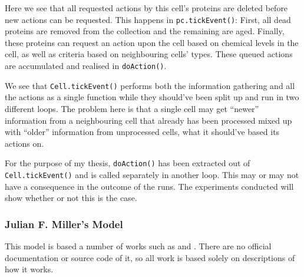 Here we see that all requested actions by this cell's proteins are deleted before new actions can be requested. This happens in \texttt{pc.tickEvent()}: First, all dead proteins are removed from the collection and the remaining are aged. Finally, these proteins can request an action upon the cell based on chemical levels in the cell, as well as criteria based on neighbouring cells' types. These queued actions are accumulated and realised in \texttt{doAction()}.

We see that \texttt{Cell.tickEvent()} performs both the information gathering and all the actions as a single function while they should've been split up and run in two different loops. The problem here is that a single cell may get ``newer'' information from a neighbouring cell that already has been processed mixed up with ``older'' information from unprocessed cells, what it should've based its actions on.

For the purpose of my thesis, \texttt{doAction()} has been extracted out of \texttt{Cell.tickEvent()} and is called separately in another loop. This may or may not have a consequence in the outcome of the runs. The experiments conducted will show whether or not this is the case.


\subsubsection{Julian F. Miller's Model}
This model is based a number of works such as \cite{mteurogp2000} and \cite{ecal2003}. There are no official documentation or source code of it, so all work is based solely on descriptions of how it works.
